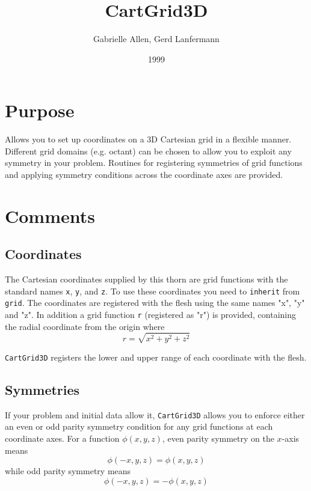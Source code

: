 \documentclass{article}
\begin{document}
\title{CartGrid3D}
\author{Gabrielle Allen, Gerd Lanfermann}
\date{1999}
\maketitle


\section{Purpose}

Allows you to set up coordinates on a 3D Cartesian grid in a 
flexible manner. Different grid domains (e.g. octant) can 
be chosen to allow you to exploit any symmetry in your 
problem. Routines for registering symmetries of grid functions
and applying symmetry conditions across the coordinate axes 
are provided.

\section{Comments}

\subsection{Coordinates}

The Cartesian coordinates supplied by this thorn are
grid functions with the standard names {\tt x}, {\tt y}, and
{\tt z}. To use these coordinates you need to {\tt inherit}
from {\tt grid}.  The coordinates are
registered with the flesh using the same names "x", "y" 
and "z". In addition a grid function {\tt r} (registered as
"r") is provided, containing the radial coordinate from
the origin where
$$
r = \sqrt{x^2+y^2+z^2}
$$

{\tt CartGrid3D} registers the lower and upper range of each coordinate
with the flesh.

\subsection{Symmetries}

If your problem and initial data allow it, {\tt CartGrid3D}
allows you to enforce either an even or odd parity
symmetry condition for any grid functions at each
coordinate axes. For a function $\phi(x,y,z)$,
even parity symmetry on the $x$-axis means
$$
\phi(-x,y,z) = \phi(x,y,z)
$$
while odd parity symmetry means
$$
\phi(-x,y,z) = -\phi(x,y,z)
$$
\end{document}
